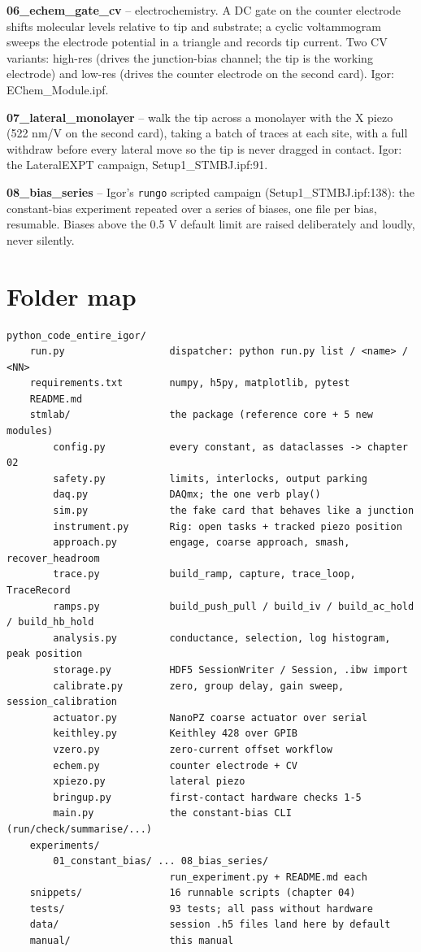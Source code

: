 \textbf{06\_echem\_gate\_cv} -- electrochemistry. A DC gate on the counter electrode shifts molecular levels relative to tip and substrate; a cyclic voltammogram sweeps the electrode potential in a triangle and records tip current. Two CV variants: high-res (drives the junction-bias channel; the tip is the working electrode) and low-res (drives the counter electrode on the second card). Igor: EChem\_Module.ipf.

\textbf{07\_lateral\_monolayer} -- walk the tip across a monolayer with the X piezo (522 nm/V on the second card), taking a batch of traces at each site, with a full withdraw before every lateral move so the tip is never dragged in contact. Igor: the LateralEXPT campaign, Setup1\_STMBJ.ipf:91.

\textbf{08\_bias\_series} -- Igor's \texttt{rungo} scripted campaign (Setup1\_STMBJ.ipf:138): the constant-bias experiment repeated over a series of biases, one file per bias, resumable. Biases above the 0.5 V default limit are raised deliberately and loudly, never silently.

\section{Folder map}

\begin{lstlisting}[style=out]
python_code_entire_igor/
    run.py                  dispatcher: python run.py list / <name> / <NN>
    requirements.txt        numpy, h5py, matplotlib, pytest
    README.md
    stmlab/                 the package (reference core + 5 new modules)
        config.py           every constant, as dataclasses -> chapter 02
        safety.py           limits, interlocks, output parking
        daq.py              DAQmx; the one verb play()
        sim.py              the fake card that behaves like a junction
        instrument.py       Rig: open tasks + tracked piezo position
        approach.py         engage, coarse approach, smash, recover_headroom
        trace.py            build_ramp, capture, trace_loop, TraceRecord
        ramps.py            build_push_pull / build_iv / build_ac_hold / build_hb_hold
        analysis.py         conductance, selection, log histogram, peak position
        storage.py          HDF5 SessionWriter / Session, .ibw import
        calibrate.py        zero, group delay, gain sweep, session_calibration
        actuator.py         NanoPZ coarse actuator over serial
        keithley.py         Keithley 428 over GPIB
        vzero.py            zero-current offset workflow
        echem.py            counter electrode + CV
        xpiezo.py           lateral piezo
        bringup.py          first-contact hardware checks 1-5
        main.py             the constant-bias CLI (run/check/summarise/...)
    experiments/
        01_constant_bias/ ... 08_bias_series/
                            run_experiment.py + README.md each
    snippets/               16 runnable scripts (chapter 04)
    tests/                  93 tests; all pass without hardware
    data/                   session .h5 files land here by default
    manual/                 this manual
\end{lstlisting}

